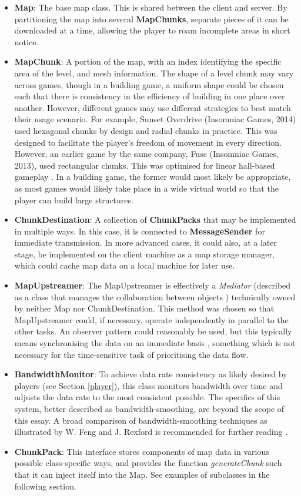 \documentclass{scrartcl}
\begin{document}
\begin{itemize}
\item \textbf{Map}: The base map class. This is shared between the client and server. By partitioning the map into several \textbf{MapChunks}, separate pieces of it can be downloaded at a time, allowing the player to roam incomplete areas in short notice.
\item \textbf{MapChunk}: A portion of the map, with an index identifying the specific area of the level, and mesh information. The shape of a level chunk may vary across games, though in a building game, a uniform shape could be chosen such that there is consistency in the efficiency of building in one place over another. However, different games may use different strategies to best match their usage scenario. For example, Sunset Overdrive (Insomniac Games, 2014) used hexagonal chunks by design and radial chunks in practice. This was designed to facilitate the player's freedom of movement in every direction. However, an earlier game by the same company, Fuse (Insomniac Games, 2013), used rectangular chunks. This was optimised for linear hall-based gameplay \cite{overdrivegdc}. In a building game, the former would most likely be appropriate, as most games would likely take place in a wide virtual world so that the player can build large structures.
\item \textbf{ChunkDestination}: A collection of \textbf{ChunkPacks} that may be implemented in multiple ways. In this case, it is connected to \textbf{MessageSender} for immediate transmission. In more advanced cases, it could also, at a later stage, be implemented on the client machine as a map storage manager, which could cache map data on a local machine for later use.
\item \textbf{MapUpstreamer}: The MapUpstreamer is effectively a \textit{Mediator} (described as a class that manages the collaboration between objects \cite{designpatterns}) technically owned by neither Map nor ChunkDestination. This method was chosen so that MapUpstreamer could, if necessary, operate independently in parallel to the other tasks. An observer pattern could reasonably be used, but this typically means synchronising the data on an immediate basis \cite{designpatterns}, something which is not necessary for the time-sensitive task of prioritising the data flow.
\item \textbf{BandwidthMonitor}: To achieve data rate consistency as likely desired by players (see Section \ref{player}), this class monitors bandwidth over time and adjusts the data rate to the most consistent possible. The specifics of this system, better described as bandwidth-smoothing, are beyond the scope of this essay. A broad comparison of bandwidth-smoothing techniques as illustrated by W. Feng and J. Rexford is recommended for further reading \cite{bandwidthsmoothing}.
\item \textbf{ChunkPack}: This interface stores components of map data in various possible class-specific ways, and provides the function \textit{generateChunk} such that it can inject itself into the Map. See examples of subclasses in the following section.
\end{itemize}
\end{document}
